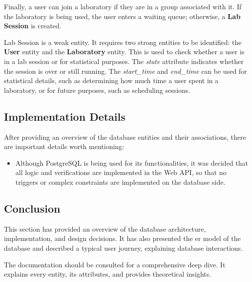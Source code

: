 Finally, a user can join a laboratory if they are in a group associated with it. If the laboratory is being used, the user enters a waiting queue; otherwise, a \textbf{Lab Session} is created.

Lab Session is a weak entity. It requires two strong entities to be identified: the \textbf{User} entity and the \textbf{Laboratory} entity. This is used to check whether a user is in a lab session or for statistical purposes. The \textit{state} attribute indicates whether the session is over or still running. The \textit{start\_time} and \textit{end\_time} can be used for statistical details, such as determining how much time a user spent in a laboratory, or for future purposes, such as scheduling sessions.

\subsection{Implementation Details}
After providing an overview of the database entities and their associations, there are important details worth mentioning:

\begin{itemize}
    \item Although PostgreSQL is being used for its functionalities, it was decided that all logic and verifications are implemented in the Web API, so that no triggers or complex constraints are implemented on the database side.
\end{itemize}

\subsection{Conclusion}
This section has provided an overview of the database architecture, implementation, and design decisions. It has also presented the \acs{er model} of the database and described a typical user journey, explaining database interactions.

The documentation should be consulted for a comprehensive deep dive. It explains every entity, its attributes, and provides theoretical insights.